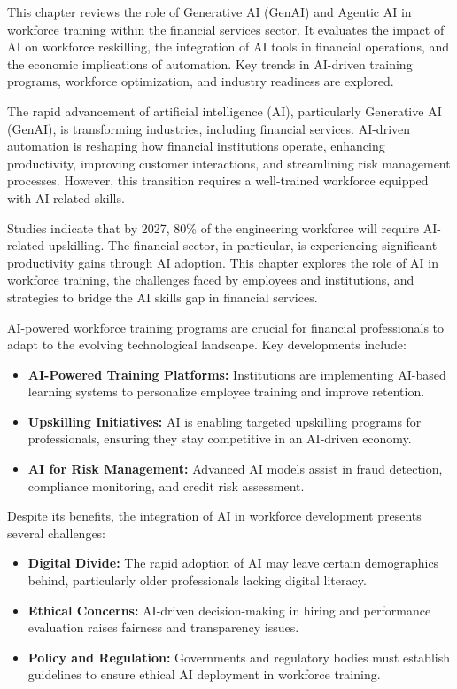 \documentclass[a4paper,headinclude=on,footinclude=on,12pt,oneside]{scrbook}
\begin{document}
This chapter reviews the role of Generative AI (GenAI) and Agentic AI in workforce training within the financial services sector. It evaluates the impact of AI on workforce reskilling, the integration of AI tools in financial operations, and the economic implications of automation. Key trends in AI-driven training programs, workforce optimization, and industry readiness are explored.


The rapid advancement of artificial intelligence (AI), particularly Generative AI (GenAI), is transforming industries, including financial services. AI-driven automation is reshaping how financial institutions operate, enhancing productivity, improving customer interactions, and streamlining risk management processes. However, this transition requires a well-trained workforce equipped with AI-related skills.

Studies indicate that by 2027, 80\% of the engineering workforce will require AI-related upskilling. The financial sector, in particular, is experiencing significant productivity gains through AI adoption. This chapter explores the role of AI in workforce training, the challenges faced by employees and institutions, and strategies to bridge the AI skills gap in financial services.


AI-powered workforce training programs are crucial for financial professionals to adapt to the evolving technological landscape. Key developments include:
\begin{itemize}
	\item \textbf{AI-Powered Training Platforms:} Institutions are implementing AI-based learning systems to personalize employee training and improve retention.
	\item \textbf{Upskilling Initiatives:} AI is enabling targeted upskilling programs for professionals, ensuring they stay competitive in an AI-driven economy.
	\item \textbf{AI for Risk Management:} Advanced AI models assist in fraud detection, compliance monitoring, and credit risk assessment.
\end{itemize}


Despite its benefits, the integration of AI in workforce development presents several challenges:
\begin{itemize}
	\item \textbf{Digital Divide:} The rapid adoption of AI may leave certain demographics behind, particularly older professionals lacking digital literacy.
	\item \textbf{Ethical Concerns:} AI-driven decision-making in hiring and performance evaluation raises fairness and transparency issues.
	\item \textbf{Policy and Regulation:} Governments and regulatory bodies must establish guidelines to ensure ethical AI deployment in workforce training.
\end{itemize}
\end{document}
